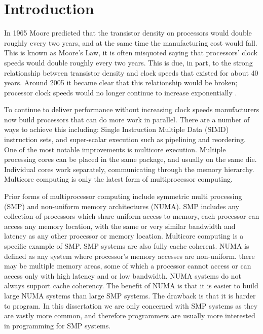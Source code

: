 %
%
\chapter{Introduction}
\label{chap:intro}


In 1965 Moore \citep{moore} predicted that the transistor 
density on processors would double roughly every two years,
and at the same time the manufacturing cost would fall.
This is known as Moore's Law,
it is often misquoted saying that processors' clock speeds would double
roughly every two years.
This is due, in part, to the strong relationship between transistor density and
clock speeds that existed for about 40 years.
Around 2005 it became clear that this relationship would be broken;
processor clock speeds would no longer continue to increase
exponentially \citep{free_lunch}.

To continue to deliver performance without increasing clock speeds
manufacturers now build processors that can do more work in parallel.
There are a number of ways to achieve this including:
Single Instruction Multiple Data (SIMD) instruction sets,
and super-scalar execution such as pipelining and reordering.
One of the most notable improvements is multicore execution.
Multiple processing cores can be placed in the same package,
and usually on the same die.
Individual cores work separately, communicating through the memory
hierarchy.
Multicore computing is only the latest form of multiprocessor computing.

Prior forms of multiprocessor computing include
symmetric multi processing (SMP) and non-uniform memory architectures
(NUMA).
SMP includes any collection of processors which share uniform access to
memory,
each processor can access any memory location,
with the same or very similar bandwidth and latency as any other processor or
memory location.
Multicore computing is a specific example of SMP.
SMP systems are also fully cache coherent.
NUMA is defined as any system where processor's memory accesses are
non-uniform.
there may be multiple memory areas, some of which a processor cannot access
or can access only with high latency and or low bandwidth.
NUMA systems do not always support cache coherency.
The benefit of NUMA is that it is easier to build large NUMA systems than
large SMP systems.
The drawback is that it is harder to program.
In this dissertation we are only concerned with SMP systems as they are
vastly more common,
and therefore programmers are usually more interested in programming for SMP
systems.

